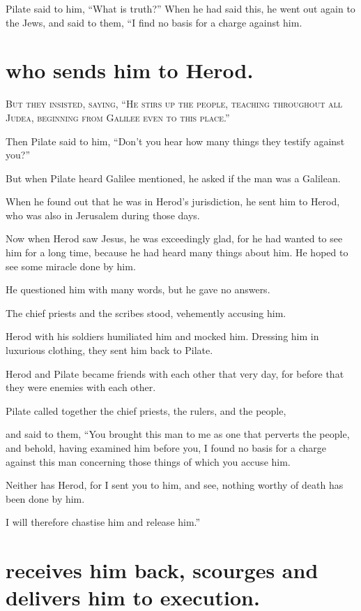 Pilate said to him, “What is truth?” When he had said this, he went out again to the Jews, and said to them, “I find no basis for a charge against him.


\clearpage \section*{who sends him to Herod.}

\lettrine{B}{ut they insisted, saying, “He stirs up the people, teaching throughout all Judea, beginning from Galilee even to this place.”}

Then Pilate said to him, “Don’t you hear how many things they testify against you?”

But when Pilate heard Galilee mentioned, he asked if the man was a Galilean.

When he found out that he was in Herod’s jurisdiction, he sent him to Herod, who was also in Jerusalem during those days.

Now when Herod saw Jesus, he was exceedingly glad, for he had wanted to see him for a long time, because he had heard many things about him. He hoped to see some miracle done by him.

He questioned him with many words, but he gave no answers.

The chief priests and the scribes stood, vehemently accusing him.

Herod with his soldiers humiliated him and mocked him. Dressing him in luxurious clothing, they sent him back to Pilate.

Herod and Pilate became friends with each other that very day, for before that they were enemies with each other.

Pilate called together the chief priests, the rulers, and the people,

and said to them, “You brought this man to me as one that perverts the people, and behold, having examined him before you, I found no basis for a charge against this man concerning those things of which you accuse him.

Neither has Herod, for I sent you to him, and see, nothing worthy of death has been done by him.

I will therefore chastise him and release him.”


\clearpage \section*{receives him back, scourges and delivers him to execution.}

